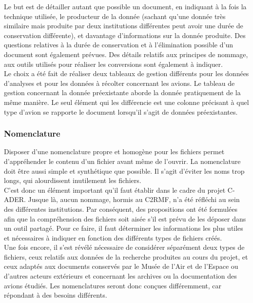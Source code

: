 Le but est de détailler autant que possible un document, en indiquant à la fois la technique utilisée, le producteur de la donnée (sachant qu’une donnée très similaire mais produite par deux institutions différentes peut avoir une durée de conservation différente), et davantage d’informations sur la donnée produite. Des questions relatives à la durée de conservation et à l’élimination possible d’un document sont également prévues. Des détails relatifs aux principes de nommage, aux outils utilisés pour réaliser les conversions sont également à indiquer.\\

Le choix a été fait de réaliser deux tableaux de gestion différents pour les données d’analyses et pour les données à récolter concernant les avions. Le tableau de gestion concernant la donnée préexistante aborde la donnée pratiquement de la même manière. Le seul élément qui les différencie est une colonne précisant à quel type d’avion se rapporte le document lorsqu'il s'agit de données préexistantes.

            \subsubsection{Nomenclature}

Disposer d’une nomenclature propre et homogène pour les fichiers permet d’appréhender le contenu d’un fichier avant même de l’ouvrir. La nomenclature doit être aussi simple et synthétique que possible. Il s’agit d’éviter les noms trop longs, qui alourdissent inutilement les fichiers.\\

C’est donc un élément important qu’il faut établir dans le cadre du projet C-ADER. Jusque là, aucun nommage, hormis au C2RMF, n’a été réfléchi au sein des différentes institutions. Par conséquent, des propositions ont été formulées afin que la compréhension des fichiers soit aisée s’il est prévu de les déposer dans un outil partagé. Pour ce faire, il faut déterminer les informations les plus utiles et nécessaires à indiquer en fonction des différents types de fichiers créés.\\

Une fois encore, il s’est révélé nécessaire de considérer séparément deux types de fichiers, ceux relatifs aux données de la recherche produites au cours du projet, et ceux adaptés aux documents conservés par le Musée de l’Air et de l’Espace ou d’autres acteurs extérieurs et concernant les archives ou la documentation des avions étudiés. Les nomenclatures seront donc conçues différemment, car répondant à des besoins différents.\\

